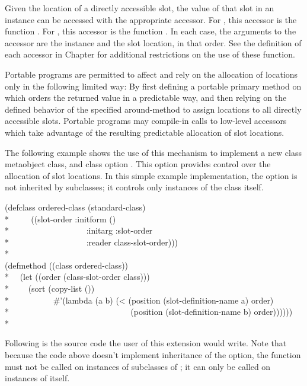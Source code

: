 Given the location of a directly accessible slot, the value of that slot in an
instance can be accessed with the appropriate accessor. For , this
accessor is the function . For
, this accessor is the function
. In each case, the arguments to the
accessor are the instance and the slot location, in that order. See the
definition of each accessor in Chapter for additional restrictions on the use of
these function. 

Portable programs are permitted to affect and rely on the allocation of
locations only in the following limited way: By first defining a portable
primary method on  which orders the returned value in a predictable
way, and then relying on the defined behavior of the specified around-method to
assign locations to all directly accessible slots. Portable programs may
compile-in calls to low-level accessors which take advantage of the resulting
predictable allocation of slot locations. 

The following example shows the use of this mechanism to implement a new class
metaobject class,  and class option . This option
provides control over the allocation of slot locations. In this simple example
implementation, the  option is not inherited by subclasses; it
controls only instances of the class itself. 

\begin{lisp}
(defclass ordered-class (standard-class)\\*
~~~~ ((slot-order :initform ()\\*
~~~~~~~~~~~~~~~~~~:initarg :slot-order\\*
~~~~~~~~~~~~~~~~~~:reader class-slot-order)))\\*
\\
(defmethod  ((class ordered-class)) \\*
~~(let ((order (class-slot-order class)))\\*
~~~~(sort (copy-list ())\\*
~~~~~~~~~~\#'(lambda (a b) (< (position (slot-definition-name a) order) \\*
~~~~~~~~~~~~~~~~~~~~~~~~~~~~ (position (slot-definition-name b) order))))))\\*
\end{lisp}

Following is the source code the user of this extension would write. Note that
because the code above doesn't implement inheritance of the  option,
the function  must not be called on instances of subclasses of ; it
can only be called on instances of  itself.


